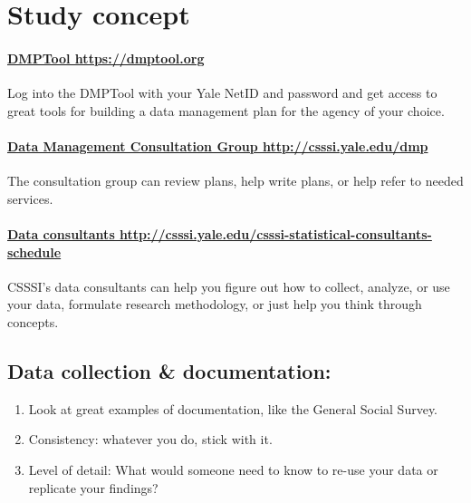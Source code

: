 \documentclass{tufte-handout}
\begin{document}
\newpage

\vspace*{-50pt}
\section{Study concept}\label{study-concept}

\paragraph{\href{https://dmptool.org}{DMPTool https://dmptool.org}}\label{dmptool}

Log into the DMPTool with your Yale NetID and password and get access to great tools for building a data management plan for the agency of your choice.

\paragraph{\href{http://csssi.yale.edu/dmp}{Data Management Consultation Group http://csssi.yale.edu/dmp}}\label{dmp-consultation-group} 
The consultation group can review plans, help write plans, or help refer to needed services.

\paragraph{\href{http://csssi.yale.edu/csssi-statistical-consultants-schedule}{Data consultants http://csssi.yale.edu/csssi-statistical-consultants-schedule} }\label{data-consultants} 
CSSSI's data consultants can help you figure out how to collect, analyze, or use your data, formulate research methodology, or just help you think through concepts. 

\marginnote
{\subsection{Data collection \& documentation:}\label{guidelines-doc}
\begin{enumerate}
\def\labelenumi{\arabic{enumi}.}
\itemsep1pt\parskip0pt
\item
  Look at great examples of documentation, like the General Social Survey.
\item
  Consistency: whatever you do, stick with it.
\item
  Level of detail: What would someone need to know to re-use your data or replicate your findings?
\end{enumerate}}
\end{document}
